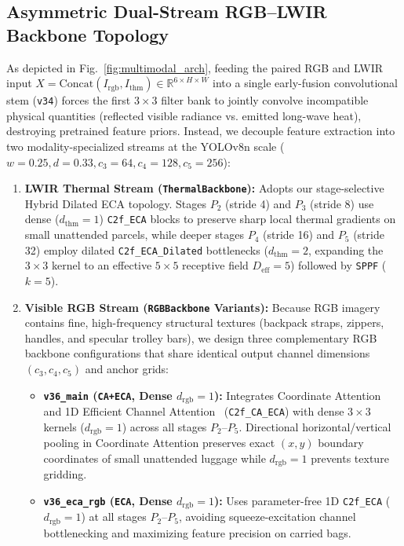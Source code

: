\documentclass[journal,twoside,web]{ieeecolor}
\begin{document}
\subsection{Asymmetric Dual-Stream RGB--LWIR Backbone Topology}
As depicted in Fig.~\ref{fig:multimodal_arch}, feeding the paired RGB and LWIR input $X = \mathrm{Concat}(I_{\text{rgb}}, I_{\text{thm}}) \in \mathbb{R}^{6\times H\times W}$ into a single early-fusion convolutional stem (\texttt{v34}) forces the first $3\times 3$ filter bank to jointly convolve incompatible physical quantities (reflected visible radiance vs. emitted long-wave heat), destroying pretrained feature priors. Instead, we decouple feature extraction into two modality-specialized streams at the YOLOv8n scale ($w=0.25, d=0.33, c_3=64, c_4=128, c_5=256$):
\begin{enumerate}
    \item \textbf{LWIR Thermal Stream (\texttt{ThermalBackbone}):} Adopts our stage-selective Hybrid Dilated ECA topology. Stages $P_2$ (stride 4) and $P_3$ (stride 8) use dense ($d_{\text{thm}}=1$) \texttt{C2f\_ECA} blocks to preserve sharp local thermal gradients on small unattended parcels, while deeper stages $P_4$ (stride 16) and $P_5$ (stride 32) employ dilated \texttt{C2f\_ECA\_Dilated} bottlenecks ($d_{\text{thm}}=2$, expanding the $3\times 3$ kernel to an effective $5\times 5$ receptive field $D_{\text{eff}}=5$) followed by \texttt{SPPF} ($k=5$).
    \item \textbf{Visible RGB Stream (\texttt{RGBBackbone} Variants):} Because RGB imagery contains fine, high-frequency structural textures (backpack straps, zippers, handles, and specular trolley bars), we design three complementary RGB backbone configurations that share identical output channel dimensions $(c_3, c_4, c_5)$ and anchor grids:
    \begin{itemize}
        \item \textbf{\texttt{v36\_main} (\texttt{CA+ECA}, Dense $d_{\text{rgb}}=1$):} Integrates Coordinate Attention~\cite{hou2021coordinate} and 1D Efficient Channel Attention~\cite{wang2020eca} (\texttt{C2f\_CA\_ECA}) with dense $3\times 3$ kernels ($d_{\text{rgb}}=1$) across all stages $P_2\text{--}P_5$. Directional horizontal/vertical pooling in Coordinate Attention preserves exact $(x,y)$ boundary coordinates of small unattended luggage while $d_{\text{rgb}}=1$ prevents texture gridding.
        \item \textbf{\texttt{v36\_eca\_rgb} (\texttt{ECA}, Dense $d_{\text{rgb}}=1$):} Uses parameter-free 1D \texttt{C2f\_ECA} ($d_{\text{rgb}}=1$) at all stages $P_2\text{--}P_5$, avoiding squeeze-excitation channel bottlenecking and maximizing feature precision on carried bags.

\end{itemize}
\end{enumerate}
\end{document}
